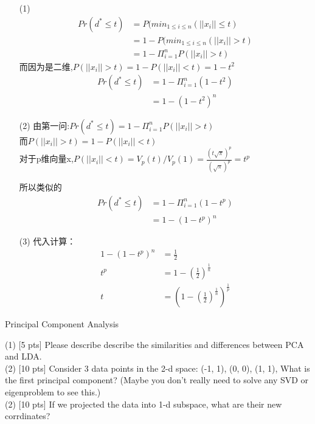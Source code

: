 \documentclass[11pt, a4paper, UTF8]{ctexart}
\begin{document}
\begin{solution}
	\begin{enumerate}
		\item[(1)] \begin{equation}
		\begin{aligned}
			Pr(d^* \leq t)	&=P(min_{1\leq i\leq n}(||x_i||\leq t)\\
										&=1-P(min_{1\leq i\leq n}(||x_i||> t)\\
										&=1-\Pi_{i=1}^{n}P(||x_i||>t)
		\end{aligned}			
		\end{equation}
		而因为是二维,$P(||x_i||>t)=1-P(||x_i||<t)=1-t^2$
		\begin{equation}
			\begin{aligned}
				Pr(d^* \leq t)	
											&=1-\Pi_{i=1}^{n}(1-t^2)\\
											&=1-(1-t^2)^n
			\end{aligned}			
			\end{equation}
	\item[(2)]
	 由第一问:$Pr(d^* \leq t)=1-\Pi_{i=1}^{n}P(||x_i||>t)$
\\	而$P(||x_i||>t)=1-P(||x_i||<t)$\\
对于p维向量x,$P(||x_i||<t)=V_p(t)/V_p(1)=\frac{(t\sqrt{\pi})^p}{(\sqrt{\pi})^p}=t^p$

所以类似的\begin{equation}
	\begin{aligned}
		Pr(d^* \leq t)	
									&=1-\Pi_{i=1}^{n}(1-t^p)\\
									&=1-(1-t^p)^n
	\end{aligned}			
	\end{equation}

\item [(3)]代入计算：\begin{equation}
\begin{aligned}
	1-(1-t^p)^n	&=\frac{1}{2}
	\\t^p&=1-(\frac{1}{2})^{\frac{1}{n}}\\
	t&=(1-(\frac{1}{2})^{\frac{1}{n}})^{\frac{1}{p}}
\end{aligned}			
\end{equation}

	\end{enumerate}
\end{solution}
\begin{problem}[ML problem 4]
	[25pts] Principal Component Analysis 
	
(1) [5 pts] Please describe describe the similarities and differences between PCA and LDA.\\
(2) [10 pts] Consider 3 data points in the 2-d space: (-1, 1), (0, 0), (1, 1), What is the first principal component? (Maybe you don't really need to solve any SVD or eigenproblem to see this.)\\
(2) [10 pts] If we projected the data into 1-d subspace, what are their new corrdinates?

\end{problem}
\end{document}
